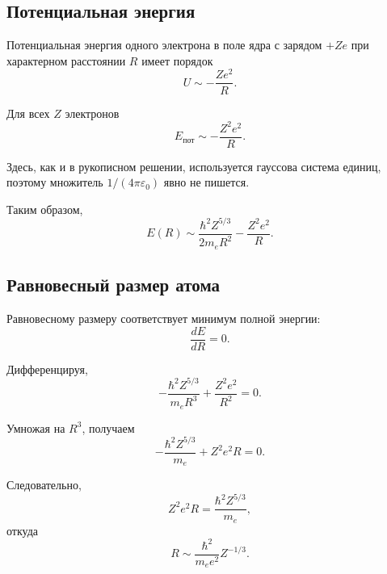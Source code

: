 \documentclass[../final.tex]{subfiles}
\begin{document}

\subsection*{Потенциальная энергия}

Потенциальная энергия одного электрона в поле ядра с зарядом $+Ze$
при характерном расстоянии $R$ имеет порядок
%
\begin{equation*}
    U
    \sim
    -\frac{Ze^2}{R}.
\end{equation*}

Для всех $Z$ электронов
%
\begin{equation*}
    E_{\text{пот}}
    \sim
    -\frac{Z^2e^2}{R}.
\end{equation*}

Здесь, как и в рукописном решении, используется гауссова система
единиц, поэтому множитель $1/(4\pi\varepsilon_0)$ явно не пишется.

Таким образом,
%
\begin{equation*}
    E(R)
    \sim
    \frac{\hbar^2Z^{5/3}}{2m_eR^2}
    -
    \frac{Z^2e^2}{R}.
\end{equation*}



\subsection*{Равновесный размер атома}

Равновесному размеру соответствует минимум полной энергии:
%
\begin{equation*}
    \frac{dE}{dR}
    =
    0.
\end{equation*}

Дифференцируя,
%
\begin{equation*}
    -\frac{\hbar^2Z^{5/3}}{m_eR^3}
    +
    \frac{Z^2e^2}{R^2}
    =
    0.
\end{equation*}

Умножая на $R^3$, получаем
%
\begin{equation*}
    -\frac{\hbar^2Z^{5/3}}{m_e}
    +
    Z^2e^2R
    =
    0.
\end{equation*}

Следовательно,
%
\begin{equation*}
    Z^2e^2R
    =
    \frac{\hbar^2Z^{5/3}}{m_e},
\end{equation*}
%
откуда
%
\begin{equation*}
    R
    \sim
    \frac{\hbar^2}{m_ee^2}
    Z^{-1/3}.
\end{equation*}
\end{document}
